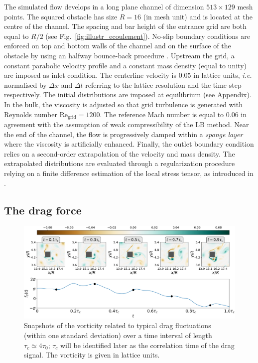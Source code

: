 \documentclass[pre,aps,floatfix,10pt,superscriptaddress, notitlepage,preprint]{revtex4-1}
\begin{document}
%
The simulated flow develops in a long plane channel of dimension $513 \times 129$ mesh points. The squared obstacle has size $R=16$ (in mesh unit) and is located at the centre of the channel. The spacing and bar height of the entrance grid are both equal to $R/2$ (see Fig.~\ref{fig:illustr_ecoulement}). 
%
No-slip boundary conditions are enforced on top and bottom walls of the channel and on the surface of the obstacle by using an halfway bounce-back procedure \cite{lbm_book}.  
%
Upstream the grid, a constant parabolic velocity profile and a constant mass density (equal to unity) are imposed as inlet condition. 
The centerline velocity is $0.05$ in lattice units, \textit{i.e.} normalised by $\Delta x$ and $\Delta t$ referring to the lattice resolution and the time-step respectively. The initial distributions are imposed at equilibrium (see Appendix). 
In the bulk, the viscosity is adjusted so that grid turbulence is generated with Reynolds number $\mathrm{Re_{grid}}=1200$. The reference Mach number is equal to $0.06$ in agreement with the assumption of weak compressibility of the LB method. 
Near the end of the channel, the flow is progressively damped within a \textit{sponge layer} where the viscosity is artificially enhanced. Finally, the outlet boundary condition relies on a second-order extrapolation of the velocity and mass density. The extrapolated distributions are evaluated through a regularization procedure relying on a finite difference estimation of the local stress tensor, as introduced in \cite{latt2008straight}. 

	
\subsection{The drag force}
\label{sec:drag_force}
	
\begin{figure}
	\centering
	\includegraphics[width=\linewidth]{ecoulement_typique/ecoulement_typique.png}
	\caption{Snapshots of the vorticity related to typical drag fluctuations (within one standard deviation) over a time interval of length $\tau_c \simeq 4\tau_0$; $\tau_c$ will be identified later as the correlation time of the drag signal.
	The vorticity is given in lattice units.}
	\label{fig:typical_vorticity}
\end{figure}
\end{document}
